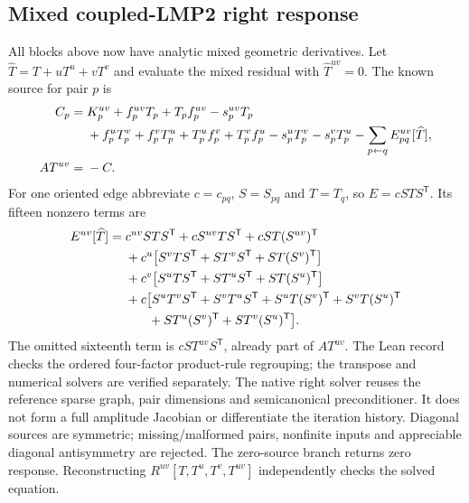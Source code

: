 \documentclass[11pt]{article}
\begin{document}
\subsection{Mixed coupled-LMP2 right response}
All blocks above now have analytic mixed geometric derivatives. Let
$\widehat T=T+uT^u+vT^v$ and evaluate the mixed residual with
$\widehat T^{uv}=0$. The known source for pair $p$ is
\begin{align}
 C_p={}&K_p^{uv}+f_p^{uv}T_p+T_pf_p^{uv}-s_p^{uv}T_p \notag\\
 &+f_p^uT_p^v+f_p^vT_p^u+T_p^uf_p^v+T_p^vf_p^u
   -s_p^uT_p^v-s_p^vT_p^u
   -\sum_{p\gets q} E_{pq}^{uv}[\widehat T],\\
 A T^{uv}={}&-C .
 \label{eq:mixed_lmp2_right}
\end{align}
For one oriented edge abbreviate $c=c_{pq}$, $S=S_{pq}$ and
$T=T_q$, so $E=cSTS^{\mathsf T}$. Its fifteen nonzero terms are
\begin{align}
 E^{uv}[\widehat T]={}&c^{uv}STS^{\mathsf T}
       +cS^{uv}TS^{\mathsf T}+cST(S^{uv})^{\mathsf T} \notag\\
 &+c^u\big[S^vTS^{\mathsf T}+ST^vS^{\mathsf T}+ST(S^v)^{\mathsf T}\big] \notag\\
 &+c^v\big[S^uTS^{\mathsf T}+ST^uS^{\mathsf T}+ST(S^u)^{\mathsf T}\big] \notag\\
 &+c\big[S^uT^vS^{\mathsf T}+S^vT^uS^{\mathsf T}
           +S^uT(S^v)^{\mathsf T}+S^vT(S^u)^{\mathsf T} \notag\\
 &\hspace{1.8em}+ST^u(S^v)^{\mathsf T}+ST^v(S^u)^{\mathsf T}\big].
\end{align}
The omitted sixteenth term is $cST^{uv}S^{\mathsf T}$, already part of
$AT^{uv}$. The Lean record checks the ordered four-factor product-rule
regrouping; the transpose and numerical solvers are verified separately.
The native right solver reuses the
reference sparse graph, pair dimensions and semicanonical preconditioner.
It does not form a full amplitude Jacobian or differentiate the iteration
history. Diagonal sources are symmetric; missing/malformed pairs,
nonfinite inputs and appreciable diagonal antisymmetry are rejected.
The zero-source branch returns zero response. Reconstructing
$R^{uv}[T,T^u,T^v,T^{uv}]$ independently checks the solved equation.
\end{document}
